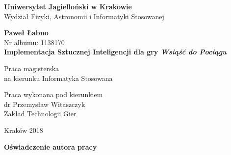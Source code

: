 \documentclass[12pt, oneside]{report}
\begin{document}
  
\setcounter{tocdepth}{1} %
\thispagestyle{empty}
\begin{titlepage}
    \begin{center}

           \Large
	\textbf{Uniwersytet Jagielloński w Krakowie}\vspace{0.2cm}\\ Wydział Fizyki, Astronomii i Informatyki Stosowanej
               \vspace*{1cm}
               
         \vspace{3cm}
         \Large
          \textbf{Paweł Łabno}\\\vspace{0.5cm}
         \normalsize Nr albumu: 1138170\\
             \vspace{2cm}
        \Huge
        \textbf{Implementacja Sztucznej Inteligencji dla gry \textit{Wsiąść do Pociągu}}
      
        \vspace{1.5cm}
        \normalsize
        Praca magisterska\\
        na kierunku Informatyka Stosowana\\ \vspace{0.15cm}
        
        \vfill
        \vspace{2cm}
       \begin{minipage}{1\textwidth}
\begin{flushright}
Praca wykonana pod kierunkiem\\
dr Przemysław Witaszczyk\\
Zakład Technologii Gier
\end{flushright}
\end{minipage}
        
        \vspace{2cm}
        \begin{center}
      Kraków 2018
        \end{center}
    \end{center}
\end{titlepage}

\newpage 
 \thispagestyle{empty}
\vspace{2.5cm}
\begin{flushleft}
\large \textbf{Oświadczenie autora pracy}\vspace{0.6cm}\\
\end{flushleft}
\end{document}
